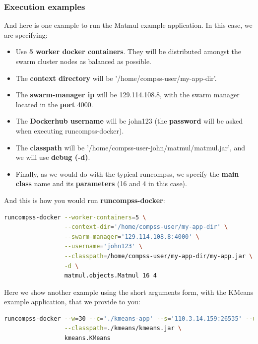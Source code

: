 \clearpage
\subsubsection{Execution examples}
And here is one example to run the Matmul example application. 
In this case, we are specifying:

\begin{itemize}  
\item Use \textbf{5 worker docker containers}. They will be distributed amongst the swarm cluster nodes as balanced as possible.
\item The \textbf{context directory} will be '/home/compss-user/my-app-dir'.
\item The \textbf{swarm-manager ip} will be 129.114.108.8, with the swarm manager located in the \textbf{port} 4000.
\item The \textbf{Dockerhub username} will be john123 (the \textbf{password} will be asked when executing runcompss-docker).
\item The \textbf{classpath} will be '/home/compss-user-john/matmul/matmul.jar', and we will use \textbf{debug (-d)}.
\item Finally, as we would do with the typical runcompss, we specify the \textbf{main class} name and its \textbf{parameters} (16 and 4 in this case).
\end{itemize}
And this is how you would run \textbf{runcompss-docker}:
\begin{lstlisting}[language=bash]
runcompss-docker --worker-containers=5 \
                 --context-dir='/home/compss-user/my-app-dir' \
                 --swarm-manager='129.114.108.8:4000' \
                 --username='john123' \
                 --classpath=/home/compss-user/my-app-dir/my-app.jar \
                 -d \
                 matmul.objects.Matmul 16 4
\end{lstlisting}           

Here we show another example using the short arguments form, with the KMeans example application, that we provide to you:
\begin{lstlisting}[language=bash]
runcompss-docker --w=30 --c='./kmeans-app' --s='110.3.14.159:26535' --u='test1947' \
                 --classpath=./kmeans/kmeans.jar \
                 kmeans.KMeans
\end{lstlisting}           



\clearpage

